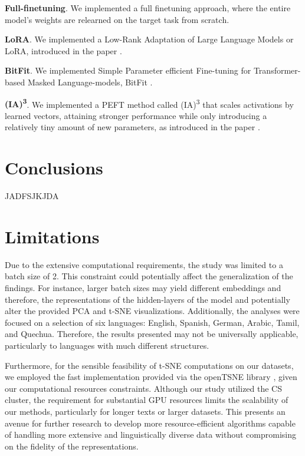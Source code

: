 \documentclass[11pt]{article}
\newcommand{\customsection}[1]{
  \noindent\textbf{#1}.\vspace{2mm}
}
\begin{document}
\customsection{Full-finetuning} We implemented a full finetuning approach, where the entire model's weights are relearned on the target task from scratch.

\customsection{LoRA} We implemented a Low-Rank Adaptation of Large Language Models or LoRA, introduced in the paper \cite{hu2021lora}.

\customsection{BitFit} We implemented Simple Parameter efficient Fine-tuning
for Transformer-based Masked Language-models, BitFit \cite{zaken2022bitfit}.

\customsection{(IA)\textsuperscript{3}} We implemented a PEFT method called (IA)\textsuperscript{3} that scales activations by learned vectors, attaining stronger performance while only introducing a relatively tiny amount of new parameters, as introduced in the paper \cite{liu2022fewshot}.

\section{Conclusions}

JADFSJKJDA

\section*{Limitations}
Due to the extensive computational requirements, the study was limited to a batch size of 2. This constraint could potentially affect the generalization of the findings. For instance, larger batch sizes may yield different embeddings and therefore, the representations of the hidden-layers of the model and potentially alter the provided PCA and t-SNE visualizations. Additionally, the analyses were focused on a selection of six languages: English, Spanish, German, Arabic, Tamil, and Quechua. Therefore, the results presented may not be universally applicable, particularly to languages with much different structures.

Furthermore, for the sensible feasibility of t-SNE computations on our datasets, we employed the fast implementation provided via the openTSNE library \cite{opentsne}, given our computational resources constraints. Although our study utilized the CS cluster, the requirement for substantial GPU resources limits the scalability of our methods, particularly for longer texts or larger datasets. This presents an avenue for further research to develop more resource-efficient algorithms capable of handling more extensive and linguistically diverse data without compromising on the fidelity of the representations.
\end{document}
